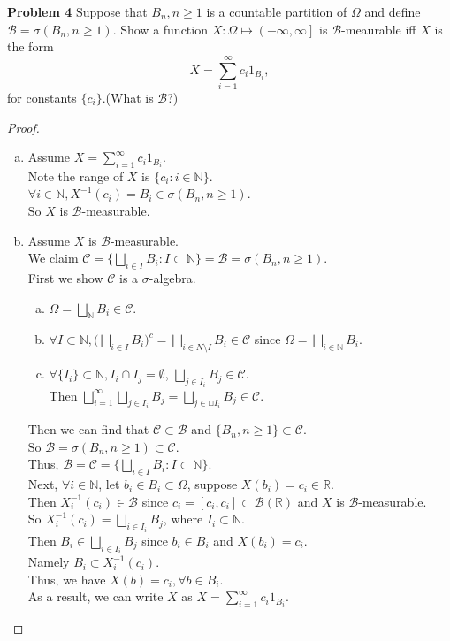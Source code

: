 \documentclass{article}
\newcommand{\llc}{\mathcal{C}}
\newcommand{\llb}{\mathcal{B}}
\newcommand{\bbr}{\mathbb{R}}
\newcommand{\bbn}{\mathbb{N}}
\begin{document}
\noindent \textbf{Problem 4} 
Suppose that ${B_n,n \geq 1}$ is a countable partition of $\Omega$ and define $\llb = \sigma(B_n,n \geq 1)$. Show a function $X: \Omega \mapsto \left.\left(- \infty, \infty\right.\right]$ is $\llb$-meaurable iff $X$ is the form \\
$$ X = \sum_{i=1}^{\infty}c_i1_{B_i},$$
for constants $\{c_i\}$.(What is $\llb$?)
\begin{proof}
	$ $ 
	\begin{enumerate}[(a)]
		\item
			Assume $ X = \sum_{i=1}^{\infty}c_i1_{B_i}$.\\
			Note the range of $X$ is $\{c_i: i \in \bbn\}$.\\
			$\forall i \in \bbn, X^{-1}(c_i) = B_i \in \sigma(B_n,n \geq 1)$.\\
			So $X$ is $\llb$-measurable.
		\item
			Assume $X$ is $\llb$-measurable.\\
			We claim $ \llc = \{\bigsqcup_{i \in I}B_i: I \subset \bbn\} = \llb = \sigma({B_n, n \geq 1})$. \\
			First we show $\llc$ is a $\sigma$-algebra. 
			\begin{enumerate}[(a)]
				\item
					$\Omega  = \bigsqcup_{\bbn}B_i \in \llc$.
				\item
					$\forall I \subset \bbn, \Big(\bigsqcup_{i \in I}B_i\Big)^c = \bigsqcup_{i \in N\setminus I}B_i \in \llc$ since $\Omega = \bigsqcup_{i\in \bbn}B_i$.
				\item
					$\forall \{I_i\} \subset \bbn, I_i \cap I_j = \emptyset$, $\bigsqcup_{j \in I_i}B_j \in \llc.$ \\
					Then $\bigsqcup_{i=1}^{\infty}\bigsqcup_{j \in I_i}B_j =  \bigsqcup_{j \in \sqcup I_i}B_j \in \llc$. 
			\end{enumerate}
			Then we can find that $\llc \subset \llb$ and $\{B_n, n \geq 1\} \subset \llc$.\\
			So $\llb = \sigma({B_n, n \geq 1}) \subset \llc$.\\
			Thus, $\llb = \llc = \{\bigsqcup_{i \in I}B_i: I \subset \bbn\} $.\\
			Next, $\forall i \in \bbn$, let $b_i \in B_i \subset \Omega$, suppose $X(b_i) = c_i \in \bbr$.\\
			Then $X_i^{-1}(c_i) \in \llb$ since $c_i = [c_i,c_i] \subset \llb(\bbr)$ and $X$ is $\llb$-measurable. \\
			So $X_i^{-1}(c_i) = \bigsqcup_{i \in I_i}B_j$, where $I_i \subset \bbn$.\\
			Then $B_i \in \bigsqcup_{i \in I_i}B_j$ since $b_i \in B_i$ and $X(b_i) = c_i$. \\
			Namely $B_i \subset X_i^{-1}(c_i)$. \\
			Thus, we have $X(b) = c_i,\forall b \in B_i$.\\
			As a result, we can write $X$ as $X = \sum_{i=1}^{\infty}c_i1_{B_i}$.\\
	\end{enumerate}
\end{proof}
\end{document}
